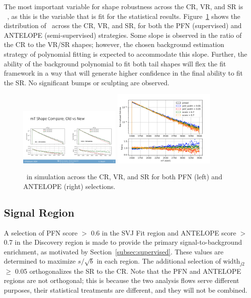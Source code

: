 The most important variable for shape robustness across the CR, VR, and SR is \mt~, as this is the variable that is fit for the statistical results.
Figure~\ref{fig:crvrsr_mt} shows the distribution of \mt~across the CR, VR, and SR, for both the PFN (supervised) and ANTELOPE (semi-supervised) strategies.
Some slope is observed in the ratio of the CR to the VR/SR shapes; however, the chosen background estimation strategy of polynomial fitting is expected to accommodate this slope.
Further, the ability of the background polynomial to fit both tail shapes will flex the fit framework in a way that will generate higher confidence in the final ability to fit the SR.
No significant bumps or sculpting are observed.%
\begin{figure}[!htbp]
\centering
   \includegraphics[width=0.45\textwidth]{figures/eventsel/PFN_mT_regions}
   \includegraphics[width=0.45\textwidth]{figures/eventsel/antelope_mT_regions}
    \caption{\mt~in simulation across the CR, VR, and SR for both PFN (left) and ANTELOPE (right) selections. 
    \label{fig:crvrsr_mt}}
\end{figure}

\subsection{Signal Region}
\label{subec:sel_sr}

A selection of PFN score $>$ 0.6 in the SVJ Fit region and ANTELOPE score $>$ 0.7 in the Discovery region is made to provide the primary signal-to-background enrichment, as motivated by Section~\ref{subsec:supervised}.
These values are determined to maximize $s/\sqrt{b}$ in each region.
The additional selection of {width$_{j2}$ $\geq$ 0.05} orthogonalizes the SR to the CR.
Note that the PFN and ANTELOPE regions are not orthogonal; this is because the two analysis flows serve different purposes, their statistical treatments are different, and they will not be combined. 

